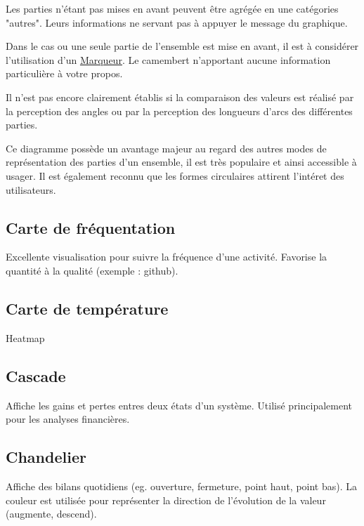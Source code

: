 \documentclass[a4paper,12pt]{article}
\begin{document}
\begin{multicols}{2}
Les parties n'étant pas mises en avant peuvent être agrégée en une catégories "autres". Leurs informations ne servant pas à appuyer le message du graphique. \autocite{jonathanschwabishParttowhole2021}

Dans le cas ou une seule partie de l'ensemble est mise en avant, il est à considérer l'utilisation d'un \hyperref[sec:org8e91ac9]{Marqueur}. Le camembert n'apportant aucune information particulière à votre propos.

Il n'est pas encore clairement établis si la comparaison des valeurs est réalisé par la perception des angles ou par la perception des longueurs d'arcs des différentes parties.\autocite{jonathanschwabishParttowhole2021}

Ce diagramme possède un avantage majeur au regard des autres modes de représentation des parties d'un ensemble, il est très populaire et ainsi accessible à usager. \autocite{jonathanschwabishParttowhole2021} Il est également reconnu que les formes circulaires attirent l'intéret des utilisateurs.\autocite{jonathanschwabishParttowhole2021}
\subsection*{Carte de fréquentation}
\label{sec:org6e8bdd3}
Excellente visualisation pour suivre la fréquence d'une activité. Favorise la quantité à la qualité (exemple : github). \autocite{alansmithLexiqueVisuel}
\subsection*{Carte de température}
\label{sec:orgd3b4902}

Heatmap
\subsection*{Cascade}
\label{sec:org28c3e9b}
Affiche les gains et pertes entres deux états d'un système. \autocite{jonathanschwabishComparingCategories2021} Utilisé principalement pour les analyses financières. \autocite{alansmithLexiqueVisuel}
\subsection*{Chandelier}
\label{sec:orgeb870b1}
Affiche des bilans quotidiens (eg. ouverture, fermeture, point haut, point bas). \autocite{alansmithLexiqueVisuel}
La couleur est utilisée pour représenter la direction de l'évolution de la valeur (augmente, descend).


\end{multicols}
\end{document}
